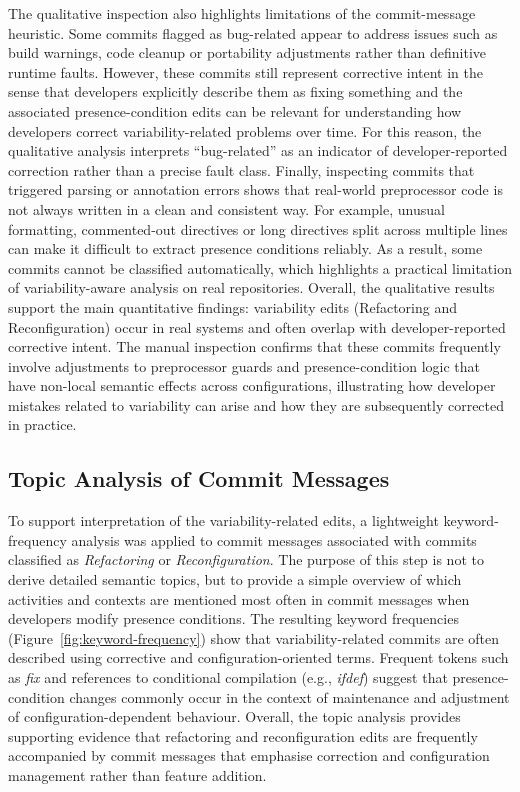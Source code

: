 The qualitative inspection also highlights limitations of the commit-message heuristic. Some commits flagged as bug-related appear to address issues such as build warnings, code cleanup or portability adjustments rather than definitive runtime faults. However, these commits still represent corrective intent in the sense that developers explicitly describe them as fixing something and the associated presence-condition edits can be relevant for understanding how developers correct variability-related problems over time. For this reason, the qualitative analysis interprets ``bug-related'' as an indicator of developer-reported correction rather than a precise fault class.
Finally, inspecting commits that triggered parsing or annotation errors shows that real-world preprocessor code is not always written in a clean and consistent way. For example, unusual formatting, commented-out directives or long directives split across multiple lines can make it difficult to extract presence conditions reliably. As a result, some commits cannot be classified automatically, which highlights a practical limitation of variability-aware analysis on real repositories.
Overall, the qualitative results support the main quantitative findings: variability edits (Refactoring and Reconfiguration) occur in real systems and often overlap with developer-reported corrective intent. The manual inspection confirms that these commits frequently involve adjustments to preprocessor guards and presence-condition logic that have non-local semantic effects across configurations, illustrating how developer mistakes related to variability can arise and how they are subsequently corrected in practice.

\subsection{Topic Analysis of Commit Messages}
To support interpretation of the variability-related edits, a lightweight keyword-frequency analysis was applied to commit messages associated with commits classified as \emph{Refactoring} or \emph{Reconfiguration}. The purpose of this step is not to derive detailed semantic topics, but to provide a simple overview of which activities and contexts are mentioned most often in commit messages when developers modify presence conditions.
The resulting keyword frequencies (Figure~\ref{fig:keyword-frequency}) show that variability-related commits are often described using corrective and configuration-oriented terms. Frequent tokens such as \emph{fix} and references to conditional compilation (e.g., \emph{ifdef}) suggest that presence-condition changes commonly occur in the context of maintenance and adjustment of configuration-dependent behaviour. Overall, the topic analysis provides supporting evidence that refactoring and reconfiguration edits are frequently accompanied by commit messages that emphasise correction and configuration management rather than feature addition.


